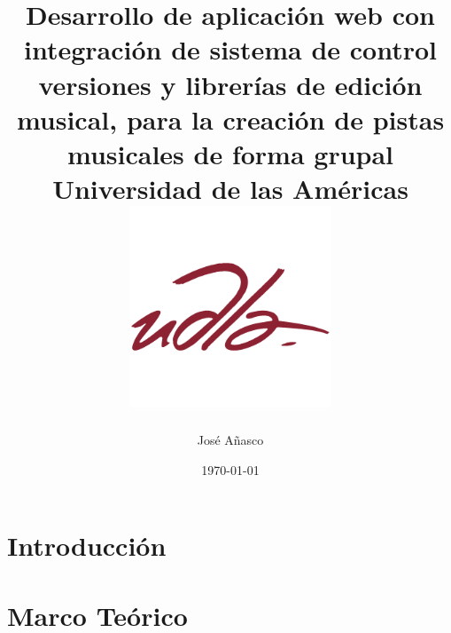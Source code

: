 \documentclass{report}
\title{
  {Desarrollo de aplicación web con integración de sistema de control versiones
  y librerías de edición musical, para la creación de pistas musicales de forma
  grupal}\\
{\large Universidad de las Américas}\\
  {\includegraphics[width=6cm,height=6cm,keepaspectratio]{udla.png}}
}
\author{José Añasco}
\date{\today}
\begin{document}
  \chapter{Introducción}
  

  \chapter{Marco Teórico}
  

  
\end{document}
